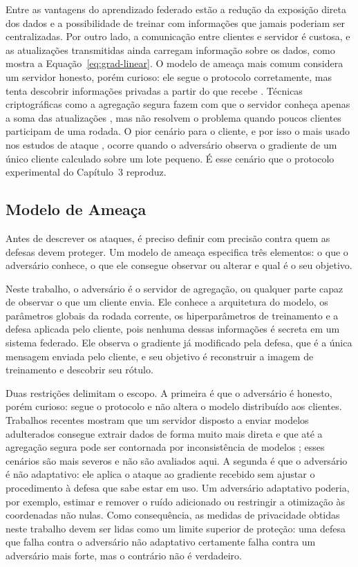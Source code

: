 Entre as vantagens do aprendizado federado estão a redução da exposição direta dos dados e a possibilidade de treinar com informações que jamais poderiam ser centralizadas. Por outro lado, a comunicação entre clientes e servidor é custosa, e as atualizações transmitidas ainda carregam informação sobre os dados, como mostra a Equação~\ref{eq:grad-linear}. O modelo de ameaça mais comum considera um servidor honesto, porém curioso: ele segue o protocolo corretamente, mas tenta descobrir informações privadas a partir do que recebe \cite{Kairouz2021}. Técnicas criptográficas como a agregação segura fazem com que o servidor conheça apenas a soma das atualizações \cite{Bonawitz2017}, mas não resolvem o problema quando poucos clientes participam de uma rodada. O pior cenário para o cliente, e por isso o mais usado nos estudos de ataque \cite{Zhu2019,Geiping2020}, ocorre quando o adversário observa o gradiente de um único cliente calculado sobre um lote pequeno. É esse cenário que o protocolo experimental do Capítulo~3 reproduz.

\subsection{Modelo de Ameaça} \label{sec:ameaca}

Antes de descrever os ataques, é preciso definir com precisão contra quem as defesas devem proteger. Um modelo de ameaça especifica três elementos: o que o adversário conhece, o que ele consegue observar ou alterar e qual é o seu objetivo.

Neste trabalho, o adversário é o servidor de agregação, ou qualquer parte capaz de observar o que um cliente envia. Ele conhece a arquitetura do modelo, os parâmetros globais da rodada corrente, os hiperparâmetros de treinamento e a defesa aplicada pelo cliente, pois nenhuma dessas informações é secreta em um sistema federado. Ele observa o gradiente já modificado pela defesa, que é a única mensagem enviada pelo cliente, e seu objetivo é reconstruir a imagem de treinamento e descobrir seu rótulo.

Duas restrições delimitam o escopo. A primeira é que o adversário é honesto, porém curioso: segue o protocolo e não altera o modelo distribuído aos clientes. Trabalhos recentes mostram que um servidor disposto a enviar modelos adulterados consegue extrair dados de forma muito mais direta \cite{Fowl2022} e que até a agregação segura pode ser contornada por inconsistência de modelos \cite{Pasquini2022}; esses cenários são mais severos e não são avaliados aqui. A segunda é que o adversário é não adaptativo: ele aplica o ataque ao gradiente recebido sem ajustar o procedimento à defesa que sabe estar em uso. Um adversário adaptativo poderia, por exemplo, estimar e remover o ruído adicionado ou restringir a otimização às coordenadas não nulas. Como consequência, as medidas de privacidade obtidas neste trabalho devem ser lidas como um limite superior de proteção: uma defesa que falha contra o adversário não adaptativo certamente falha contra um adversário mais forte, mas o contrário não é verdadeiro.

